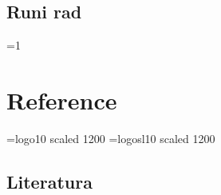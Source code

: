 \documentclass[12pt, twoside, a4paper]{article}
\def\navod#1{\leavevmode\setbox\qqbox\hbox{``}\hbox to \wd\qqbox{,\hss,}#1\hbox to \wd\qqbox{`\hss`}}
\begin{document}









\newpage

\subsection{Ru{\cv}ni rad}






\def\alphainsection{0}

\let\oldsection=\section
\def\section{%
  \ifnum\alphainsection=1%
    \addtocounter{alphasect}{1}
  \fi%
\oldsection}%

\renewcommand\thesection{%
 \ifnum\alphainsection=1%
   \Alph{alphasect}%
 \else
   \arabic{section}%
 \fi%
}%

\newenvironment{alphasection}{%
  \ifnum\alphainsection=1%
    \errhelp={Let other blocks end at the beginning of the next block.}
    \errmessage{Nested Alpha section not allowed}
  \fi%
  \setcounter{alphasect}{0}
  \def\alphainsection{1}
}{%
  \setcounter{alphasect}{0}
  \def\alphainsection{0}
}%



% 

\section{Reference}


\renewcommand{\labelenumi}{[{\it\arabic{enumi}\/}]}
\def\lit#1#2#3(#4){\item #1: {\navod{#2}},
  \def\vol{#3}\ifx\vol\empty\else {\sl\vol\/} \fi (#4)}
\font\logoten=logo10 scaled 1200
\font\logoteni=logosl10 scaled 1200
\def\MP{{\logoten META}\-{\logoten POST}}
\def\link#1#2{\item\href{#1}{#2}\hfill\break{\footnotesize\url{#1}}}

\subsection{Literatura}
\end{document}
